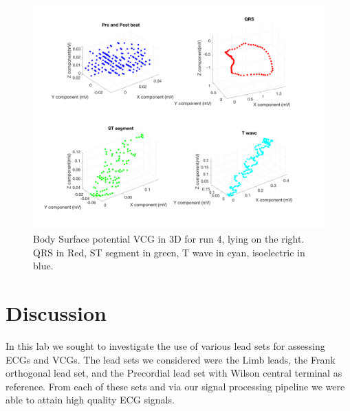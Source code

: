 \documentclass[12pt]{article}
\begin{document}
\begin{figure}[H]
	
	\centering
	\includegraphics[width = .95\textwidth]{Figures/BSP_run4_3d.png}
	\caption{Body Surface potential VCG in 3D for run 4, lying on the right. QRS in Red, ST segment in green, T wave in cyan, isoelectric in blue. }
	\label{fig:BSP4}
\end{figure}



\section{Discussion}
\par{}
In this lab we sought to investigate the use of various lead sets for assessing ECGs and VCGs. The lead sets we considered were the Limb leads, the Frank orthogonal lead set, and the Precordial lead set with Wilson central terminal as reference. From each of these sets and via our signal processing pipeline we were able to attain high quality ECG signals. 


%
%
\end{document}
